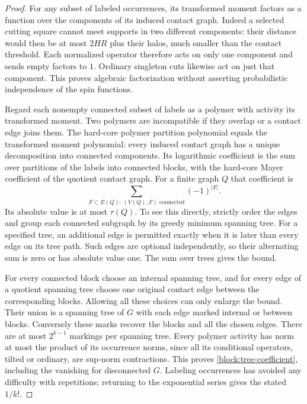 \begin{proof}
For any subset of labeled occurrences, its transformed moment factors
as a function over the components of its induced contact graph.
Indeed a selected cutting square cannot meet supports in two different
components: their distance would then be at most $2HR$ plus their
halos, much smaller than the contact threshold.  Each normalized
operator therefore acts on only one component and sends empty factors
to $1$.  Ordinary singleton cuts likewise act on just that component.
This proves algebraic factorization without asserting probabilistic
independence of the spin functions.

Regard each nonempty connected subset of labels as a polymer with
activity its transformed moment.  Two polymers are incompatible if
they overlap or a contact edge joins them.  The hard-core polymer
partition polynomial equals the transformed moment polynomial:
every induced contact graph has a unique decomposition into connected
components.  Its logarithmic coefficient is the sum over partitions
of the labels into connected blocks, with the hard-core Mayer
coefficient of the quotient contact graph.  For a finite graph $Q$
that coefficient is
\[
 \sum_{F\subset E(Q):\,(V(Q),F)\text{ connected}}(-1)^{|F|}.
\]
Its absolute value is at most $\tau(Q)$.  To see this directly, strictly
order the edges and group each connected subgraph by its greedy
minimum spanning tree.  For a specified tree, an additional edge is
permitted exactly when it is later than every edge on its tree path.
Such edges are optional independently, so their alternating sum is
zero or has absolute value one.  The sum over trees gives the bound.

For every connected block choose an internal spanning tree, and for
every edge of a quotient spanning tree choose one original contact
edge between the corresponding blocks.  Allowing all these choices
can only enlarge the bound.  Their union is a spanning tree of $G$
with each edge marked internal or between blocks.  Conversely these
marks recover the blocks and all the chosen edges.  There are at most
$2^{k-1}$ markings per spanning tree.  Every polymer activity has norm
at most the product of its occurrence norms, since all its conditional
operators, tilted or ordinary, are sup-norm contractions.  This proves
\eqref{block:tree-coefficient}, including the vanishing for disconnected
$G$.  Labeling occurrences has avoided any difficulty with repetitions;
returning to the exponential series gives the stated $1/k!$.


\end{proof}
